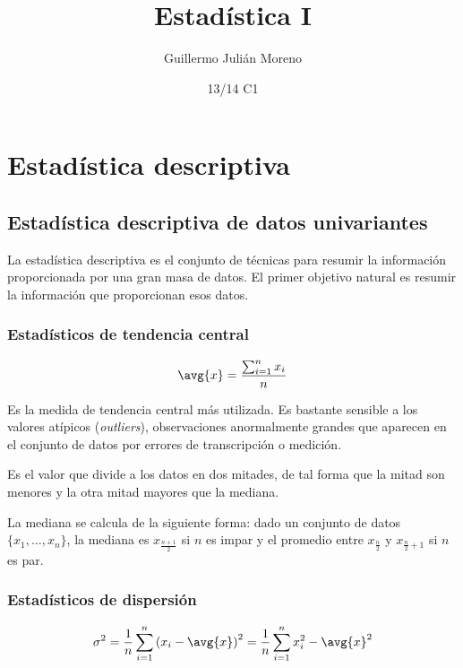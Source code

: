 \documentclass{apuntes}
\author{Guillermo Julián Moreno}
\date{13/14 C1}
\title{Estad\'{i}stica I}
\begin{document}
\pagestyle{plain}
\maketitle

\tableofcontents
\newpage
\chapter{Estadística descriptiva}
\section{Estadística descriptiva de datos univariantes}

La estadística descriptiva es el conjunto de técnicas para resumir la información proporcionada por una gran masa de datos. El primer objetivo natural es resumir la información que proporcionan esos datos.

\subsection{Estadísticos de tendencia central}

\begin{defn}[Media]

\[ \avg{x} = \frac{\sum_{i=1}^n x_i}{n} \]

Es la medida de tendencia central más utilizada. Es bastante sensible a los valores atípicos (\textit{outliers}), observaciones anormalmente grandes que aparecen en el conjunto de datos por errores de transcripción o medición.
\end{defn}

\begin{defn}[Mediana]
Es el valor que divide a los datos en dos mitades, de tal forma que la mitad son menores y la otra mitad mayores que la mediana. 

La mediana se calcula de la siguiente forma: dado un conjunto de datos $\{x_1,\dotsc, x_n\}$, la mediana es $x_{\frac{n+1}{2}}$ si $n$ es impar y el promedio entre $x_{\frac{n}{2}}$ y $x_{\frac{n}{2} + 1}$ si $n$ es par.
\end{defn} 

\subsection{Estadísticos de dispersión}

\begin{defn}[Varianza]
\[ \sigma^2 = \frac{1}{n} \sum_{i=1}^n \left(x_i - \avg{x}\right)^2 = \frac{1}{n} \sum_{i=1}^n x_i^2 - \avg{x}^2 \]
\end{defn}
\end{document}
